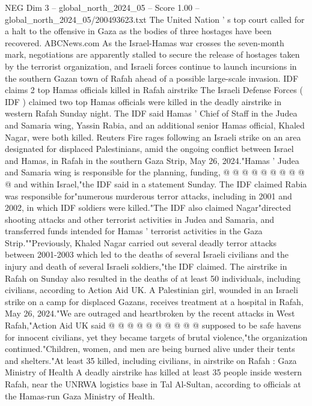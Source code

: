 \begin{textsample}{NEG Dim 3 – global\_north\_2024\_05 – Score 1.00 – global\_north\_2024\_05/200493623.txt}  \label{ex:f3_neg_443}
The United Nation ' s top court called for a halt to the offensive in Gaza as the bodies of three hostages have been recovered.
ABCNews.com As the Israel-Hamas war crosses the seven-month mark, negotiations are apparently stalled to secure the release of hostages taken by the terrorist organization, and Israeli forces continue to launch incursions in the southern Gazan town of Rafah ahead of a possible large-scale invasion.
IDF claims 2 top Hamas officials killed in Rafah airstrike The Israeli Defense Forces ( IDF ) claimed two top Hamas officials were killed in the deadly airstrike in western Rafah Sunday night.
The IDF said Hamas ' Chief of Staff in the Judea and Samaria wing, Yassin Rabia, and an additional senior Hamas official, Khaled Nagar, were both killed.
Reuters Fire rages following an Israeli strike on an area designated for displaced Palestinians, amid the ongoing conflict between Israel and Hamas, in Rafah in the southern Gaza Strip, May 26, 2024."Hamas ' Judea and Samaria wing is responsible for the planning, funding, @ @ @ @ @ @ @ @ @ @ and within Israel,"the IDF said in a statement Sunday.
The IDF claimed Rabia was responsible for"numerous murderous terror attacks, including in 2001 and 2002, in which IDF soldiers were killed."The IDF also claimed Nagar"directed shooting attacks and other terrorist activities in Judea and Samaria, and transferred funds intended for Hamas ' terrorist activities in the Gaza Strip.""Previously, Khaled Nagar carried out several deadly terror attacks between 2001-2003 which led to the deaths of several Israeli civilians and the injury and death of several Israeli soldiers,"the IDF claimed.
The airstrike in Rafah on Sunday also resulted in the deaths of at least 50 individuals, including civilians, according to Action Aid UK.
A Palestinian girl, wounded in an Israeli strike on a camp for displaced Gazans, receives treatment at a hospital in Rafah, May 26, 2024."We are outraged and heartbroken by the recent attacks in West Rafah,"Action Aid UK said @ @ @ @ @ @ @ @ @ @ supposed to be safe havens for innocent civilians, yet they became targets of brutal violence,"the organization continued."Children, women, and men are being burned alive under their tents and shelters."At least 35 killed, including civilians, in airstrike on Rafah : Gaza Ministry of Health A deadly airstrike has killed at least 35 people inside western Rafah, near the UNRWA logistics base in Tal Al-Sultan, according to officials at the Hamas-run Gaza Ministry of Health.

\end{textsample}
